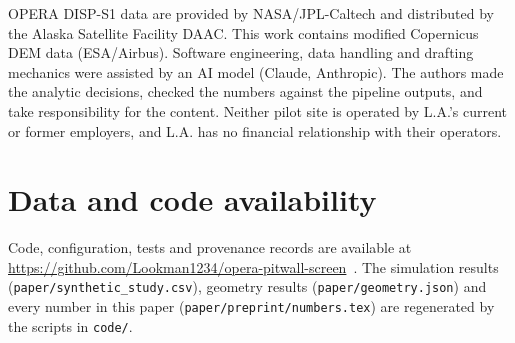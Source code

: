 \documentclass[aps,prd,twocolumn,superscriptaddress,nofootinbib,floatfix,preprintnumbers,10pt]{revtex4-2}
\begin{document}
\begin{acknowledgments}
OPERA DISP-S1 data are provided by NASA/JPL-Caltech and distributed by the Alaska Satellite Facility DAAC. This work contains modified Copernicus DEM data (ESA/Airbus). Software engineering, data handling and drafting mechanics were assisted by an AI model (Claude, Anthropic). The authors made the analytic decisions, checked the numbers against the pipeline outputs, and take responsibility for the content. Neither pilot site is operated by L.A.'s current or former employers, and L.A. has no financial relationship with their operators.
\end{acknowledgments}

\section*{Data and code availability}
Code, configuration, tests and provenance records are available at \url{https://github.com/Lookman1234/opera-pitwall-screen}~\cite{Alabede2026}. The simulation results (\texttt{paper/synthetic\_study.csv}), geometry results (\texttt{paper/geometry.json}) and every number in this paper (\texttt{paper/preprint/numbers.tex}) are regenerated by the scripts in \texttt{code/}.


\end{document}
